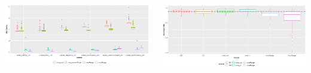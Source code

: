 \documentclass[20pt,margin=1in,innermargin=-4.5in,blockverticalspace=-0.25in]{tikzposter}
\begin{document}
\begin{columns}
{        \begin{center}
            \vspace{-1em}
            \begin{tikzfigure}[]
                \includegraphics[width=1\linewidth]{plot_comp_time.png}
            \end{tikzfigure}
        \end{center}
       
        \vspace{-2em}

        \begin{center}
            \vspace{-1em}
            \begin{tikzfigure}[]
                \includegraphics[width=1\linewidth]{plot_coverage.png}
            \end{tikzfigure}
        \end{center}
        
        \vspace{-1em}

    }
  
\end{columns}
\end{document}
